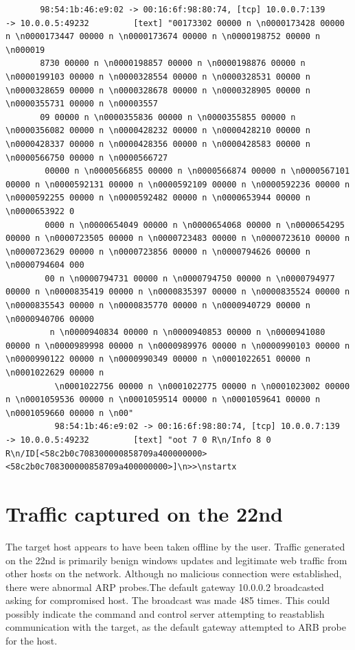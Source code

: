 \documentclass[11pt]{diazessay} %
\begin{document}
\begin{lstlisting}
	   98:54:1b:46:e9:02 -> 00:16:6f:98:80:74, [tcp] 10.0.0.7:139           -> 10.0.0.5:49232         [text] "00173302 00000 n \n0000173428 00000 n \n0000173447 00000 n \n0000173674 00000 n \n0000198752 00000 n \n000019
	   8730 00000 n \n0000198857 00000 n \n0000198876 00000 n \n0000199103 00000 n \n0000328554 00000 n \n0000328531 00000 n \n0000328659 00000 n \n0000328678 00000 n \n0000328905 00000 n \n0000355731 00000 n \n00003557
	   09 00000 n \n0000355836 00000 n \n0000355855 00000 n \n0000356082 00000 n \n0000428232 00000 n \n0000428210 00000 n \n0000428337 00000 n \n0000428356 00000 n \n0000428583 00000 n \n0000566750 00000 n \n0000566727
	    00000 n \n0000566855 00000 n \n0000566874 00000 n \n0000567101 00000 n \n0000592131 00000 n \n0000592109 00000 n \n0000592236 00000 n \n0000592255 00000 n \n0000592482 00000 n \n0000653944 00000 n \n0000653922 0
		0000 n \n0000654049 00000 n \n0000654068 00000 n \n0000654295 00000 n \n0000723505 00000 n \n0000723483 00000 n \n0000723610 00000 n \n0000723629 00000 n \n0000723856 00000 n \n0000794626 00000 n \n0000794604 000
		00 n \n0000794731 00000 n \n0000794750 00000 n \n0000794977 00000 n \n0000835419 00000 n \n0000835397 00000 n \n0000835524 00000 n \n0000835543 00000 n \n0000835770 00000 n \n0000940729 00000 n \n0000940706 00000
		 n \n0000940834 00000 n \n0000940853 00000 n \n0000941080 00000 n \n0000989998 00000 n \n0000989976 00000 n \n0000990103 00000 n \n0000990122 00000 n \n0000990349 00000 n \n0001022651 00000 n \n0001022629 00000 n
		  \n0001022756 00000 n \n0001022775 00000 n \n0001023002 00000 n \n0001059536 00000 n \n0001059514 00000 n \n0001059641 00000 n \n0001059660 00000 n \n00"
		  98:54:1b:46:e9:02 -> 00:16:6f:98:80:74, [tcp] 10.0.0.7:139           -> 10.0.0.5:49232         [text] "oot 7 0 R\n/Info 8 0 R\n/ID[<58c2b0c708300000858709a400000000><58c2b0c708300000858709a400000000>]\n>>\nstartx

\end{lstlisting}


\section{Traffic captured on the 22nd}

The target host appears to have been taken offline by the user. Traffic generated on the 22nd is primarily benign windows updates and legitimate web traffic from other hosts on the network. Although no malicious connection were established, there were abnormal ARP probes.The default gateway 10.0.0.2 broadcasted asking for compromised host. The broadcast was made 485 times. This could possibly indicate the command and control server attempting to reastablish communication with the target, as the default gateway attempted to ARB probe for the host.
\end{document}

